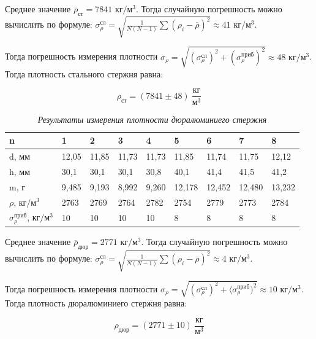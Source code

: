 \documentclass[a4paper,12pt]{article}
\begin{document}
Среднее значение $\overline{\rho}_\text{ст} = 7841$ $\text{кг}/\text{м}^3$. Тогда случайную погрешность можно вычислить по формуле: $ \sigma_\rho^\text{сл} = \sqrt{\frac{1}{N  (N-1)}\sum(\rho_i-\overline{\rho})^2} \approx 41 \text{ кг}/\text{м}^3$.

Тогда погрешность измерения плотности $\sigma_\rho = \sqrt{(\sigma_\rho^\text{сл})^2 + (\overline{\sigma_\rho^\text{приб}})^2} \approx 48 \text{ кг}/\text{м}^3 $. Тогда плотность стального стержня равна:

\begin{equation}
    \rho_\text{ст} = (7841 \pm 48) \ \frac{\text{кг}}{\text{м}^3}
\end{equation}

\begin{table}[!ht]
    \centering
    \begin{tabular}{|l|l|l|l|l|l|l|l|l|}
    \hline
        n & 1 & 2 & 3 & 4 & 5 & 6 & 7 & 8 \\ \hline
        d, мм & 12,05 & 11,85 & 11,73 & 11,73 & 11,85 & 11,74 & 11,75 & 12,12 \\ \hline
        h, мм & 30,1 & 30,1 & 30,1 & 30,8 & 40,1 & 41,4 & 41,5 & 41,2 \\ \hline
        m, г & 9,485 & 9,193 & 8,992 & 9,260 & 12,178 & 12,452 & 12,480 & 13,232 \\ \hline
        $\rho$, $\text{кг}/\text{м}^3$ & 2763 & 2769 & 2764 & 2782 & 2754 & 2779 & 2773 & 2784 \\ \hline
        $\sigma_\rho^\text{приб}$, $\text{кг}/\text{м}^3$ & 10 & 10 & 10 & 10 & 8 & 8 & 8 & 8 \\ \hline
    \end{tabular}\caption{\textit{Результаты измерения плотности дюралюминиего стержня}}\label{dural-density}
\end{table}

Среднее значение $\overline{\rho}_\text{дюр} = 2771$ $\text{кг}/\text{м}^3$. Тогда случайную погрешность можно вычислить по формуле: $ \sigma_\rho^\text{сл} = \sqrt{\frac{1}{N  (N-1)}\sum(\rho_i-\overline{\rho})^2} \approx 4 \text{ кг}/\text{м}^3$.

Тогда погрешность измерения плотности $\sigma_\rho = \sqrt{(\sigma_\rho^\text{сл})^2 + \langle\sigma_\rho^\text{приб})^2} \approx 10 \text{ кг}/\text{м}^3 $. Тогда плотность дюралюминиего стержня равна:

\begin{equation}
    \rho_\text{дюр} = (2771 \pm 10) \ \frac{\text{кг}}{\text{м}^3}
\end{equation}
\end{document}
